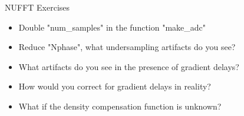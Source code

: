 \begin{frame}{NUFFT Exercises}
	\begin{itemize}
		\item Double "num\_samples" in the function "make\_adc"
		\vspace{1em}
        \item Reduce "Nphase", what undersampling artifacts do you see?
        \vspace{1em}
		\item What artifacts do you see in the presence of gradient delays?
		\vspace{1em}
        \item How would you correct for gradient delays in reality?
		\vspace{1em}
        \item What if the density compensation function is unknown?
	\end{itemize}
\end{frame}
